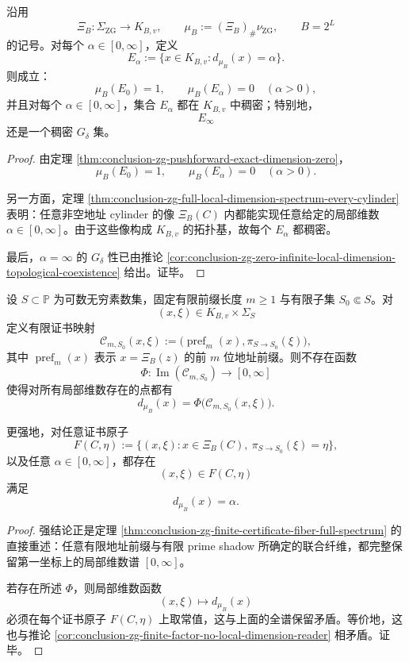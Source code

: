 \begin{theorem}[零精确维与全谱稠密性的严格并存]\label{thm:conclusion-zg-exact-zero-dense-spectrum-coexistence}
沿用
\[
\Xi_B:\Sigma_{\mathrm{ZG}}\to K_{B,v},
\qquad
\mu_B:=(\Xi_B)_\#\nu_{\mathrm{ZG}},
\qquad
B=2^L
\]
的记号。对每个 \(\alpha\in[0,\infty]\)，定义
\[
E_\alpha:=\{x\in K_{B,v}: d_{\mu_B}(x)=\alpha\}.
\]
则成立：
\[
\mu_B(E_0)=1,
\qquad
\mu_B(E_\alpha)=0
\quad (\alpha>0),
\]
并且对每个 \(\alpha\in[0,\infty]\)，集合 \(E_\alpha\) 都在 \(K_{B,v}\) 中稠密；特别地，
\[
E_\infty
\]
还是一个稠密 \(G_\delta\) 集。
\end{theorem}
\begin{proof}
由定理 \ref{thm:conclusion-zg-pushforward-exact-dimension-zero}，
\[
\mu_B(E_0)=1,
\qquad
\mu_B(E_\alpha)=0
\quad (\alpha>0).
\]

另一方面，定理 \ref{thm:conclusion-zg-full-local-dimension-spectrum-every-cylinder} 表明：任意非空地址 cylinder 的像 \(\Xi_B(C)\) 内都能实现任意给定的局部维数 \(\alpha\in[0,\infty]\)。由于这些像构成 \(K_{B,v}\) 的拓扑基，故每个 \(E_\alpha\) 都稠密。

最后，\(\alpha=\infty\) 的 \(G_\delta\) 性已由推论 \ref{cor:conclusion-zg-zero-infinite-local-dimension-topological-coexistence} 给出。证毕。
\end{proof}

\begin{theorem}\label{thm:conclusion-zg-finite-prefix-shadow-local-dimension-blindness}
设 \(S\subset\mathbb P\) 为可数无穷素数集，固定有限前缀长度 \(m\ge 1\) 与有限子集 \(S_0\Subset S\)。对
\[
(x,\xi)\in K_{B,v}\times \Sigma_S
\]
定义有限证书映射
\[
\mathcal C_{m,S_0}(x,\xi)
:=
\bigl(\operatorname{pref}_m(x),\pi_{S\to S_0}(\xi)\bigr),
\]
其中 \(\operatorname{pref}_m(x)\) 表示 \(x=\Xi_B(z)\) 的前 \(m\) 位地址前缀。则不存在函数
\[
\Phi:\operatorname{Im}(\mathcal C_{m,S_0})\to [0,\infty]
\]
使得对所有局部维数存在的点都有
\[
d_{\mu_B}(x)=\Phi\bigl(\mathcal C_{m,S_0}(x,\xi)\bigr).
\]

更强地，对任意证书原子
\[
F(C,\eta)
:=
\{(x,\xi):x\in \Xi_B(C),\ \pi_{S\to S_0}(\xi)=\eta\},
\]
以及任意 \(\alpha\in[0,\infty]\)，都存在
\[
(x,\xi)\in F(C,\eta)
\]
满足
\[
d_{\mu_B}(x)=\alpha.
\]
\end{theorem}
\begin{proof}
强结论正是定理 \ref{thm:conclusion-zg-finite-certificate-fiber-full-spectrum} 的直接重述：任意有限地址前缀与有限 prime shadow 所确定的联合纤维，都完整保留第一坐标上的局部维数谱 \([0,\infty]\)。

若存在所述 \(\Phi\)，则局部维数函数
\[
(x,\xi)\longmapsto d_{\mu_B}(x)
\]
必须在每个证书原子 \(F(C,\eta)\) 上取常值，这与上面的全谱保留矛盾。等价地，这也与推论 \ref{cor:conclusion-zg-finite-factor-no-local-dimension-reader} 相矛盾。证毕。
\end{proof}


